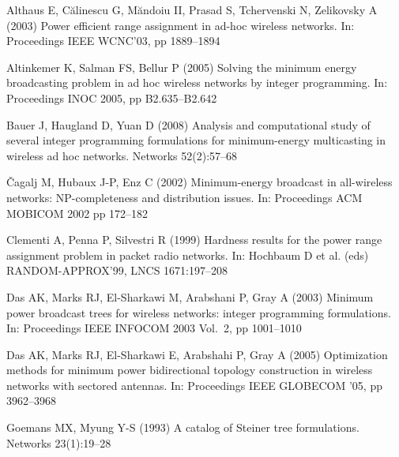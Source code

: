 \documentclass[natbib,smallextended]{svjour3}       %
\begin{document}
\begin{thebibliography}{}

%
%

Althaus E, C\u{a}linescu G, M\u{a}ndoiu II, Prasad S, Tchervenski N, Zelikovsky A (2003)
Power efficient range assignment in ad-hoc wireless networks.
In: Proceedings IEEE WCNC’03, pp 1889--1894

Altinkemer K, Salman FS, Bellur P (2005)
Solving the minimum energy broadcasting problem in ad hoc wireless networks by integer programming.
In: Proceedings INOC 2005, pp B2.635--B2.642

Bauer J, Haugland D, Yuan D (2008)
Analysis and computational study of several integer programming formulations for minimum-energy multicasting in wireless ad hoc networks.
Networks 52(2):57–68

\v{C}agalj M, Hubaux J-P, Enz C (2002)
Minimum-energy broadcast in all-wireless networks: NP-completeness and distribution issues.
In: Proceedings ACM MOBICOM 2002 pp 172--182

Clementi A, Penna P, Silvestri R (1999)
Hardness results for the power range assignment problem in packet radio networks.
In: Hochbaum D et al. (eds) RANDOM-APPROX’99,
LNCS 1671:197--208

Das AK, Marks RJ, El-Sharkawi M, Arabshani P, Gray A (2003)
Minimum power broadcast trees for wireless networks: integer programming formulations.
In: Proceedings IEEE INFOCOM 2003 Vol.\ 2, pp 1001--1010

Das AK, Marks RJ, El-Sharkawi E, Arabshahi P, Gray A (2005)
Optimization methods for minimum power bidirectional topology construction in wireless networks with sectored antennas.
In: Proceedings IEEE GLOBECOM ’05, pp 3962--3968

Goemans MX, Myung Y-S (1993)
A catalog of Steiner tree formulations.
Networks
23(1):19--28


\end{thebibliography}
\end{document}
